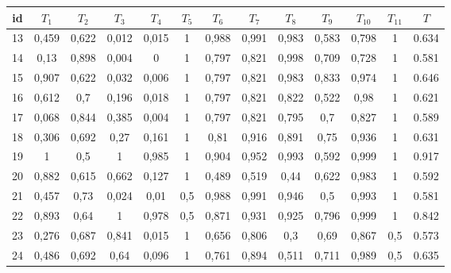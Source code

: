 \documentclass{classrep}
\begin{document}
\begin{center}
  \begin{table}[H]
  \begin{adjustbox}{center=11cm}
    \begin{tabularx}{\textwidth}{ccccccccccccc}
    id & $T_1$ & $T_2$ & $T_3$ & $T_4$ & $T_5$ & $T_6$ & $T_7$ & $T_8$ & $T_9$ & $T_{10}$ & $T_{11}$ & $T$ \\ \hline 
   13 & 0,459 &  0,622 & 0,012 & 0,015 & 1 & 0,988 & 0,991 & 0,983 & 0,583 & 0,798 & 1 & 0.634 \\ \hline
   14 & 0,13 & 0,898 & 0,004 & 0 & 1 & 0,797 & 0,821 & 0,998 & 0,709 & 0,728 & 1 & 0.581 \\ \hline
   15 & 0,907& 0,622 & 0,032 & 0,006 & 1 & 0,797 & 0,821 & 0,983 & 0,833 & 0,974 & 1 & 0.646 \\ \hline
   16 & 0,612 & 0,7 & 0,196 & 0,018 & 1 & 0,797 & 0,821 & 0,822 & 0,522 & 0,98 & 1 & 0.621 \\ \hline
   17 & 0,068 & 0,844 & 0,385 & 0,004 & 1 & 0,797 & 0,821 & 0,795 & 0,7 & 0,827 & 1 & 0.589 \\ \hline
   18 & 0,306 & 0,692 & 0,27 & 0,161 & 1 & 0,81 & 0,916 & 0,891 & 0,75 & 0,936 & 1 & 0.631 \\ \hline
   19 & 1 & 0,5 & 1 & 0,985 & 1 & 0,904 & 0,952 & 0,993 & 0,592 & 0,999 & 1 & 0.917 \\ \hline
   20 & 0,882 & 0,615 & 0,662 & 0,127 & 1 & 0,489 & 0,519 & 0,44 & 0,622 & 0,983 & 1 & 0.592 \\ \hline
   21 & 0,457 & 0,73 & 0,024 & 0,01 & 0,5 & 0,988 & 0,991 & 0,946 & 0,5 & 0,993 & 1 & 0.581 \\ \hline
   22 & 0,893 & 0,64 & 1 & 0,978 & 0,5 & 0,871 & 0,931 & 0,925 & 0,796 & 0,999 & 1 & 0.842 \\ \hline
   23 & 0,276 & 0,687 & 0,841 & 0,015 & 1 & 0,656 & 0,806 & 0,3 & 0,69 & 0,867 & 0,5 & 0.573 \\ \hline
   24 & 0,486 & 0,692 & 0,64 & 0,096 & 1 & 0,761 & 0,894 & 0,511 & 0,711 & 0,989 & 0,5 & 0.635 \\ \hline
  

\end{tabularx}
\end{adjustbox}
\end{table}
\end{center}
\end{document}
